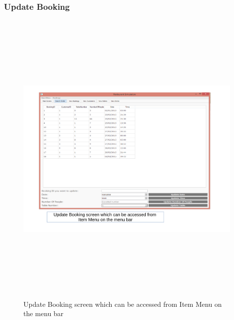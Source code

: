 \begin{landscape}
\subsubsection{Update Booking}
\begin{figure}[H]
    \includegraphics[height = 15cm]{./Maintenance/images/screen8}
    \caption{Update Booking screen which can be accessed from Item Menu on the menu bar} \label{fig:screen8}
\end{figure}


\end{landscape}
